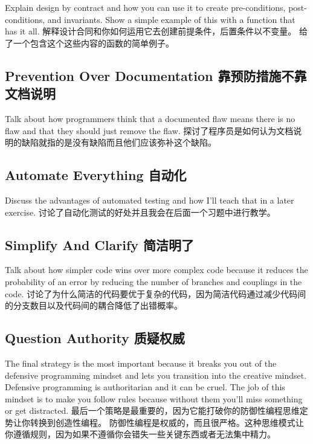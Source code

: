 Explain design by contract and how you can use it to create pre-conditions, post-conditions, and 
invariants.  Show a simple example of this with a function that has it all.
解释设计合同和你如何运用它去创建前提条件，后置条件以不变量。 给了一个包含这个这些内容的函数的简单例子。

\subsection{Prevention Over Documentation 靠预防措施不靠文档说明}

Talk about how programmers think that a documented flaw means there is no flaw and that they
should just remove the flaw.
探讨了程序员是如何认为文档说明的缺陷就指的是没有缺陷而且他们应该弥补这个缺陷。

\subsection{Automate Everything 自动化}

Discuss the advantages of automated testing and how I'll teach that in a later exercise.
讨论了自动化测试的好处并且我会在后面一个习题中进行教学。

\subsection{Simplify And Clarify 简洁明了}

Talk about how simpler code wins over more complex code because it reduces the probability of
an error by reducing the number of branches and couplings in the code.
讨论了为什么简洁的代码要优于复杂的代码，因为简洁代码通过减少代码间的分支数目以及代码间的耦合降低了出错概率。

\subsection{Question Authority 质疑权威}

The final strategy is the most important because it breaks you out of the
defensive programming mindset and lets you transition into the creative
mindset.  Defensive programming is authoritarian and it can be cruel.  The
job of this mindset is to make you follow rules because without them you'll
miss something or get distracted. 最后一个策略是最重要的，因为它能打破你的防御性编程思维定势让你转换到创造性编程。
防御性编程是权威的，而且很严格。这种思维模式让你遵循规则，因为如果不遵循你会错失一些关键东西或者无法集中精力。

